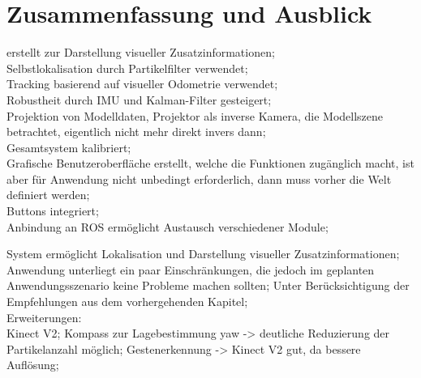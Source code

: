 \chapter{Zusammenfassung und Ausblick}
\label{chap:zusammenfassung}

\kps{} erstellt zur Darstellung visueller Zusatzinformationen;\\
Selbstlokalisation durch Partikelfilter verwendet;\\
Tracking basierend auf visueller Odometrie verwendet;\\
Robustheit durch IMU und Kalman-Filter gesteigert;\\
Projektion von Modelldaten, Projektor als inverse Kamera, die Modellszene betrachtet, eigentlich nicht mehr direkt invers dann;\\
Gesamtsystem kalibriert;\\
Grafische Benutzeroberfläche erstellt, welche die Funktionen zugänglich macht, ist aber für Anwendung nicht unbedingt erforderlich, dann muss vorher die Welt definiert werden;\\
Buttons integriert;\\
Anbindung an ROS ermöglicht Austausch verschiedener Module;

System ermöglicht Lokalisation und Darstellung visueller Zusatzinformationen;\\
Anwendung unterliegt ein paar Einschränkungen, die jedoch im geplanten Anwendungsszenario keine Probleme machen sollten; Unter Berücksichtigung der Empfehlungen aus dem vorhergehenden Kapitel;\\

Erweiterungen:\\
Kinect V2;
Kompass zur Lagebestimmung yaw -> deutliche Reduzierung der Partikelanzahl möglich;
Gestenerkennung -> Kinect V2 gut, da bessere Auflösung;

